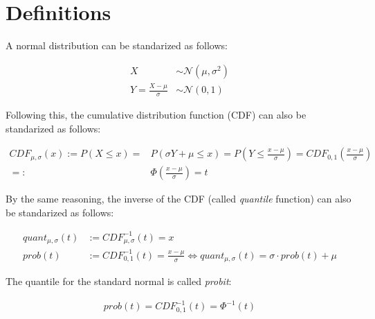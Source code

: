 \documentclass{article}
\numberwithin{equation}{section}
\begin{document}


\section{Definitions}


A normal distribution can be standarized as follows:

\begin{equation}
  \begin{aligned}
    X &\sim \mathcal{N}(\mu, \sigma^2)\\
    Y = \frac{X - \mu}{\sigma} &\sim \mathcal{N}(0, 1)
  \end{aligned}
\end{equation}

Following this, the cumulative distribution function (CDF) can also be standarized as follows:

\begin{equation}\label{cdf_def}
  \begin{aligned}
    CDF_{\mu, \sigma}(x) := P(X \leq x) = &P(\sigma Y + \mu \leq x) = P(Y \leq \frac{x - \mu}{\sigma}) = CDF_{0, 1}(\frac{x - \mu}{\sigma})\\
    =: &\Phi(\frac{x - \mu}{\sigma}) = t
  \end{aligned}
\end{equation}

By the same reasoning, the inverse of the CDF (called \textit{quantile} function) can also be standarized as follows:

\begin{equation} \label{quant_norm}
  \begin{aligned}
    quant_{\mu, \sigma}(t) &:= CDF_{\mu, \sigma}^{-1}(t) = x\\
    prob(t) &:= CDF_{0, 1}^{-1}(t) = \frac{x - \mu}{\sigma} \iff quant_{\mu, \sigma}(t) = \sigma \cdot prob(t) + \mu
  \end{aligned}
\end{equation}

The quantile for the standard normal is called \textit{probit}:

\begin{equation}
  \begin{aligned}
    prob(t) = CDF_{0, 1}^{-1}(t) = \Phi^{-1}(t)\\[20pt]
  \end{aligned}
\end{equation}
\end{document}
